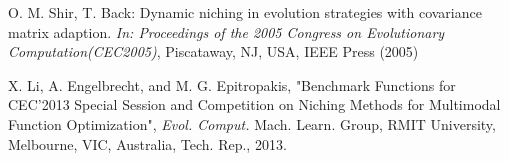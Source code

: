\documentclass[conference]{IEEEtran}
\begin{document}
\begin{thebibliography}{00}
O. M. Shir, T. Back: Dynamic niching in evolution strategies with covariance matrix adaption. \textit{In: Proceedings of the 2005 Congress on Evolutionary Computation(CEC2005)}, Piscataway, NJ, USA, IEEE Press (2005)



X. Li, A. Engelbrecht, and M. G. Epitropakis, "Benchmark Functions for CEC'2013 Special Session and Competition on Niching Methods for Multimodal Function Optimization", {\it Evol. Comput.} Mach. Learn. Group, RMIT University, Melbourne, VIC, Australia, Tech. Rep., 2013.
\end{thebibliography}
\end{document}
